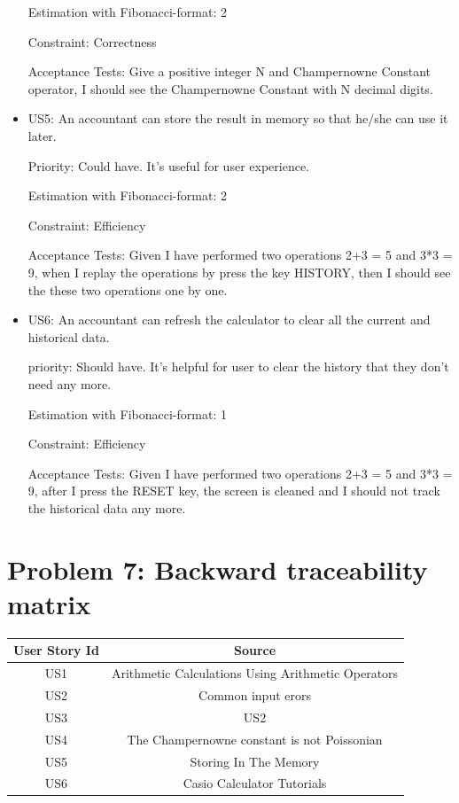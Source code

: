 \documentclass[10pt]{article}
\begin{document}
\begin{itemize}
    Estimation with Fibonacci-format: 2
    
    Constraint: Correctness
    
    Acceptance Tests: Give a positive integer N and Champernowne Constant operator, I should see the  Champernowne Constant with N decimal digits.
    
    \item US5: An accountant can store the result in memory so that he/she can use it later.
    
    Priority: Could have. It's useful for user experience.
    
    Estimation with Fibonacci-format: 2
    
    Constraint: Efficiency
    
    Acceptance Tests: Given I have performed two operations 2+3 = 5 and 3*3 = 9, when I replay the operations by press the key HISTORY, then I should see the these two operations one by one.
    
    \item US6: An accountant can refresh the calculator to clear all the current and historical data.
    
    priority: Should have. It's helpful for user to clear the history that they don't need any more.
    
    Estimation with Fibonacci-format: 1
    
    Constraint: Efficiency
    
    Acceptance Tests: Given I have performed two operations 2+3 = 5 and 3*3 = 9, after I press the RESET key, the screen is cleaned and I should not track the historical data any more.
\end{itemize}

\section{Problem 7: Backward traceability matrix}
\begin{center}
 \begin{tabular}{||c c||} 
 \hline
 User Story Id & Source \\ [0.5ex] 
 \hline\hline
 US1 & Arithmetic Calculations Using Arithmetic Operators \cite{Arithmetic Calculations Using Arithmetic Operators}   \\ 
 \hline
 US2 & Common input erors \cite{Common Input Errors}  \\
 \hline
 US3 & US2 \\
 \hline
 US4 & The Champernowne constant is not Poissonian \cite{The Champernowne constant is not Poissonian} \\
 \hline
 US5 & Storing In The Memory \cite{Storing In The Memory}  \\
  \hline
 US6 & Casio Calculator Tutorials \cite{Casio Calculator Tutorials} \\ [1ex] 
 \hline
\end{tabular}
\end{center}
\end{document}
